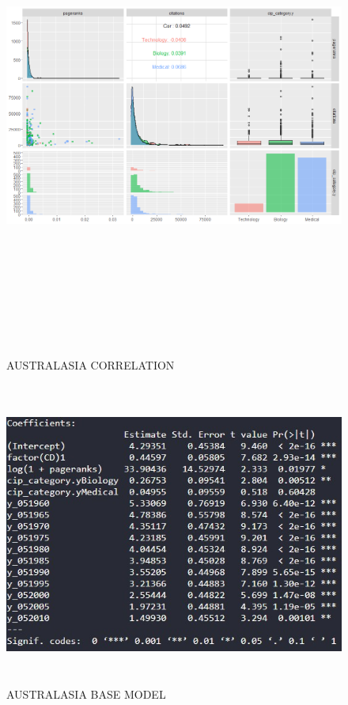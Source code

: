 \documentclass[a4paper,11pt]{article}
\theoremstyle{mytheor}
\begin{document}
\begin{figure}[ht]
    \centering
    \includegraphics[width=16cm, height=16cm]{aus_nonstrict_cor.png}
    \caption{AUSTRALASIA CORRELATION}
    \label{fig:AUSTRALASIA CORRELATION}
\end{figure}
\newpage
\begin{figure}[ht]
    \centering
    \includegraphics[width=16cm, height=10cm]{aus_coeff_non.jpg}
    \caption{AUSTRALASIA BASE MODEL}
    \label{fig:AUSTRALASIA BASE CORRELATION}
\end{figure} 
\end{document}
